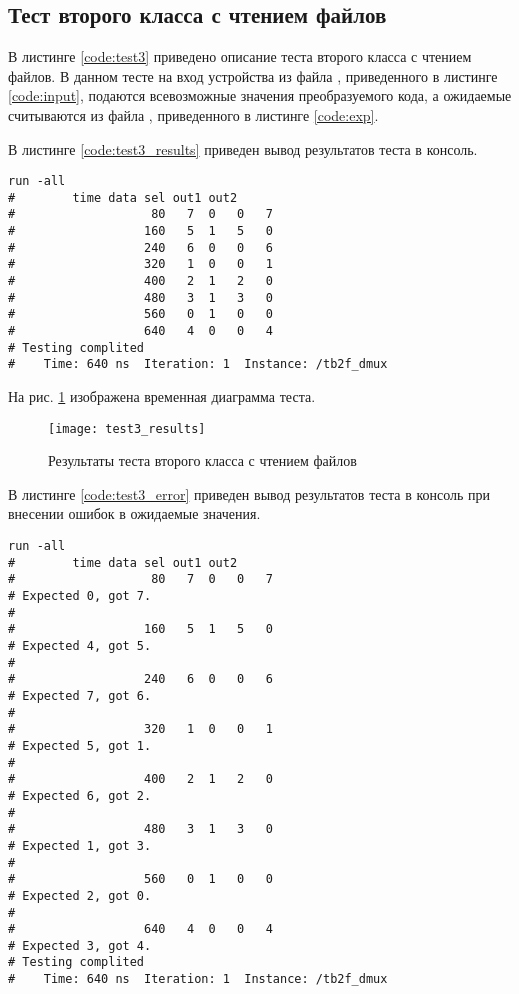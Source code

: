 \subsection{Тест второго класса с чтением файлов}

В листинге \ref{code:test3} приведено описание теста второго класса с чтением файлов. В данном тесте на вход устройства из файла , приведенного в листинге \ref{code:input}, подаются всевозможные значения преобразуемого кода, а ожидаемые считываются из файла , приведенного в листинге \ref{code:exp}. 

	


В листинге \ref{code:test3_results} приведен вывод результатов теста в консоль.
\begin{lstlisting}[caption=Результаты теста второго класса с чтением файлов, label=code:test3_results, language={}]
run -all
# 		 time data sel out1 out2
#                   80   7  0   0   7
#                  160   5  1   5   0
#                  240   6  0   0   6
#                  320   1  0   0   1
#                  400   2  1   2   0
#                  480   3  1   3   0
#                  560   0  1   0   0
#                  640   4  0   0   4
# Testing complited
#    Time: 640 ns  Iteration: 1  Instance: /tb2f_dmux
\end{lstlisting}

На рис. \ref{fig:test3_results} изображена временная диаграмма теста.
\begin{figure}[H]
	\begin{center}
		\texttt{[image: test3\_results]}
		\caption{Результаты теста второго класса с чтением файлов}
		\label{fig:test3_results}
	\end{center}
\end{figure}

В листинге \ref{code:test3_error} приведен вывод результатов теста в консоль при внесении ошибок в ожидаемые значения.
\begin{lstlisting}[caption=Результаты ошибочного теста второго класса с чтением файлов, label=code:test3_error, style=console]
run -all
# 		 time data sel out1 out2
#                   80   7  0   0   7
# Expected 0, got 7.
# 
#                  160   5  1   5   0
# Expected 4, got 5.
# 
#                  240   6  0   0   6
# Expected 7, got 6.
# 
#                  320   1  0   0   1
# Expected 5, got 1.
# 
#                  400   2  1   2   0
# Expected 6, got 2.
# 
#                  480   3  1   3   0
# Expected 1, got 3.
# 
#                  560   0  1   0   0
# Expected 2, got 0.
# 
#                  640   4  0   0   4
# Expected 3, got 4.
# Testing complited
#    Time: 640 ns  Iteration: 1  Instance: /tb2f_dmux
\end{lstlisting}

